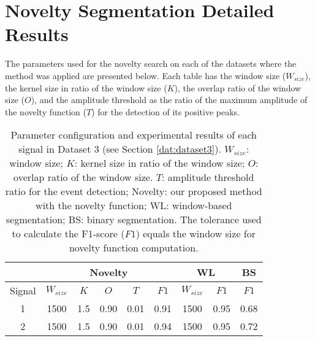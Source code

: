 \section{Novelty Segmentation Detailed Results}

The parameters used for the novelty search on each of the datasets where the method was applied are presented below. Each table has the window size ($W_{size}$), the kernel size in ratio of the window size ($K$), the overlap ratio of the window size ($O$), and the amplitude threshold as the ratio of the maximum amplitude of the novelty function ($T$) for the detection of its positive peaks.

\begin{table}
    \caption{Parameter configuration and experimental results of each signal in Dataset 3 (see Section \ref{dat:dataset3}). $W_{size}$: window size; $K$: kernel size in ratio of the window size; $O$: overlap ratio of the window size. $T$: amplitude threshold ratio for the event detection; Novelty: our proposed method with the novelty function; WL: window-based segmentation; BS: binary segmentation. The tolerance used to calculate the F1-score ($F1$) equals the window size for novelty function computation.}
    \centering
    \begin{tabular}{ccccccccc}
    \toprule
    & \multicolumn{5}{c}{Novelty} & \multicolumn{2}{c}{WL} & BS\\
    \midrule
    Signal &     $W_{size}$ &     $K$ &     $O$ &   $T$    &     $F1$ & $W_{size}$ & $F1$ & $F1$\\
    \cmidrule(lr){2-6} \cmidrule(lr){7-8} \cmidrule(lr){9-9}
    1 & 1500 & 1.5 & 0.90 & 0.01 & 0.91 & 1500 & 0.95 & 0.68 \\
    2 & 1500 & 1.5 & 0.90 & 0.01 & 0.94 & 1500 & 0.95 & 0.72 \\
    \bottomrule
    \end{tabular}
    \label{tab:params_results_1}
\end{table}


